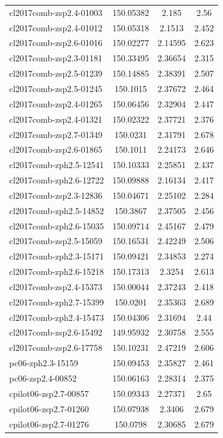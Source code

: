 \documentclass[twocolumn,tight,times]{aastex63}
\begin{document}
\begin{center}
\begin{longtable}{l|c|c|c}
cl2017comb-zsp2.4-01003 & 150.05382 & 2.185 & 2.56 \\
cl2017comb-zsp2.4-01012 & 150.05318 & 2.1513 & 2.452 \\
cl2017comb-zsp2.6-01016 & 150.02277 & 2.14595 & 2.623 \\
cl2017comb-zsp2.3-01181 & 150.33495 & 2.36654 & 2.315 \\
cl2017comb-zsp2.5-01239 & 150.14885 & 2.38391 & 2.507 \\
cl2017comb-zsp2.5-01245 & 150.1015 & 2.37672 & 2.464 \\
cl2017comb-zsp2.4-01265 & 150.06456 & 2.32904 & 2.447 \\
cl2017comb-zsp2.4-01321 & 150.02322 & 2.37721 & 2.376 \\
cl2017comb-zsp2.7-01349 & 150.0231 & 2.31791 & 2.678 \\
cl2017comb-zsp2.6-01865 & 150.1011 & 2.24173 & 2.646 \\
cl2017comb-zph2.5-12541 & 150.10333 & 2.25851 & 2.437 \\
cl2017comb-zph2.6-12722 & 150.09888 & 2.16134 & 2.417 \\
cl2017comb-zsp2.3-12836 & 150.04671 & 2.25102 & 2.284 \\
cl2017comb-zph2.5-14852 & 150.3867 & 2.37505 & 2.456 \\
cl2017comb-zph2.6-15035 & 150.09714 & 2.45167 & 2.479 \\
cl2017comb-zsp2.5-15059 & 150.16531 & 2.42249 & 2.506 \\
cl2017comb-zph2.3-15171 & 150.09421 & 2.34853 & 2.274 \\
cl2017comb-zph2.6-15218 & 150.17313 & 2.3254 & 2.613 \\
cl2017comb-zsp2.4-15373 & 150.00044 & 2.37243 & 2.418 \\
cl2017comb-zph2.7-15399 & 150.0201 & 2.35363 & 2.689 \\
cl2017comb-zph2.4-15473 & 150.04306 & 2.31694 & 2.44 \\
cl2017comb-zsp2.6-15492 & 149.95932 & 2.30758 & 2.555 \\
cl2017comb-zsp2.6-17758 & 150.10231 & 2.47219 & 2.606 \\
pc06-zph2.3-15159 & 150.09453 & 2.35827 & 2.461 \\
pc06-zsp2.4-00852 & 150.06163 & 2.28314 & 2.375 \\
cpilot06-zsp2.7-00857 & 150.09343 & 2.27371 & 2.65 \\
cpilot06-zsp2.7-01260 & 150.07938 & 2.3406 & 2.679 \\
cpilot06-zsp2.7-01276 & 150.0798 & 2.30685 & 2.679 \\

\end{longtable}
\end{center}
\end{document}
